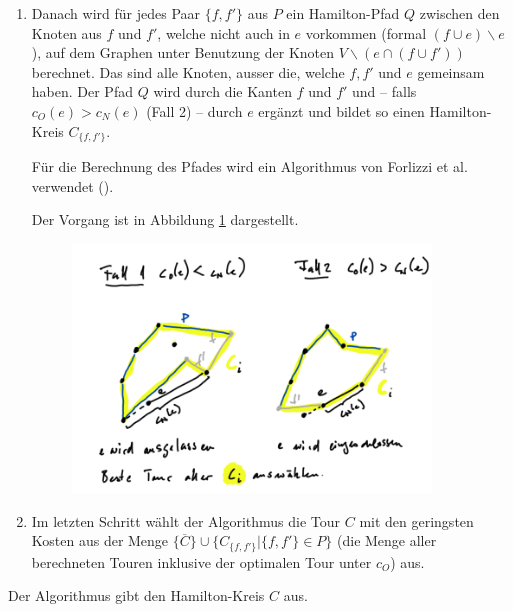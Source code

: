 \documentclass[a4paper,11pt]{scrreprt}
\begin{document}
\begin{enumerate}
\begin{description}
\end{description}

\item Danach wird für jedes Paar $\{f, f'\}$ aus $P$ ein Hamilton-Pfad $Q$ zwischen den Knoten aus $f$ und $f'$, welche nicht auch in $e$ vorkommen (formal $(f \cup e)\backslash e$), auf dem Graphen unter Benutzung der Knoten $V\backslash(e\cap(f\cup f'))$ berechnet. Das sind alle Knoten, ausser die, welche $f, f'$ und $e$ gemeinsam haben. Der Pfad $Q$ wird durch die Kanten $f$ und $f'$ und -- falls $c_O(e) > c_N(e)$ (Fall 2) -- durch $e$ ergänzt und bildet so einen Hamilton-Kreis $C_{\{f, f'\}}$. 

Für die Berechnung des Pfades wird ein Algorithmus von Forlizzi et al. verwendet (\cite{for1}).

Der Vorgang ist in Abbildung \ref{fig:lm-beta-approx2} dargestellt.

\begin{figure}[H]
\centering
\includegraphics[width=0.9\textwidth]{lm_beta_approx2.png}
\caption{}
\label{fig:lm-beta-approx2}
\end{figure}

\item Im letzten Schritt wählt der Algorithmus die Tour $C$ mit den geringsten Kosten aus der Menge $\{\overline{C}\} \cup \{C_{\{f, f'\}} | \{f, f'\} \in P \}$ (die Menge aller berechneten Touren inklusive der optimalen Tour unter $c_O$) aus.
\end{enumerate}

Der Algorithmus gibt den Hamilton-Kreis $C$ aus.
\end{document}
